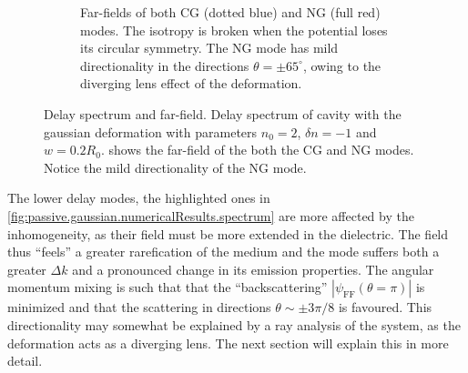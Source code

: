 \begin{figure}
\begin{subfigure}{0.39\textwidth}
  \caption{Far-fields of both CG (dotted blue) and NG (full red) modes. The isotropy is broken 
	  when the potential loses its circular symmetry. The NG mode has mild directionality
	  in the directions $\theta=\pm65^\circ$, owing to the diverging lens effect of the deformation.}
  \label{fig:passive.gaussian.numericalResults.farField}
 \end{subfigure}
 \caption[Delay spectrum of the Gaussian cavity and the far-fields of two chosen modes]
	  {Delay spectrum and far-field. \textbf{} 
	  Delay spectrum of cavity with the gaussian deformation with parameters $n_0=2$, $\delta n=-1$ and $w=0.2R_0$.
	  \textbf{} shows the far-field of the both the CG and NG modes.
	  Notice the mild directionality of the NG mode.}
 \label{fig:passive.gaussian.numericalResults}
\end{figure}

The lower delay modes, the highlighted ones in \ref{fig:passive.gaussian.numericalResults.spectrum}
are more affected by the inhomogeneity, as their field must be more
extended in the dielectric. The field thus ``feels'' a greater
rarefication of the medium and the mode suffers both a greater $\Delta k$
and a pronounced change in its emission properties. The angular momentum
mixing is such that that the ``backscattering'' $|\psi_\text{FF}(\theta=\pi)|$
is minimized and that the scattering in directions $\theta\sim\pm3\pi/8$
is favoured. This directionality may somewhat be explained by a
ray analysis of the system, as the deformation acts as a diverging
lens. The next section will explain this in more detail. 


